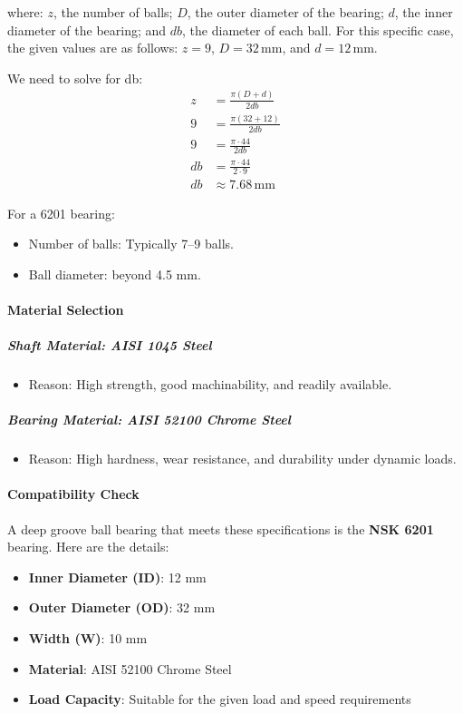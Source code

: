\documentclass[../../main]{subfiles}
\begin{document}
where: $z$, the number of balls; $D$, the outer diameter of the bearing; $d$, the inner diameter of the bearing; and $db$, the diameter of each ball. For this specific case, the given values are as follows: $z = 9$, $D = 32 \, \mathrm{mm}$, and $d = 12 \, \mathrm{mm}$.

We need to solve for db:
\begin{align*}
  z &= \frac{\pi (D + d)}{2 db} \\
  9 &= \frac{\pi (32 + 12)}{2 db} \\
  9 &= \frac{\pi \cdot 44}{2 db} \\
  db &= \frac{\pi \cdot 44}{2 \cdot 9} \\
  db &\approx 7.68 \, \mathrm{mm}
\end{align*}

For a 6201 bearing:

\begin{itemize}
\item
  Number of balls: Typically 7--9 balls.
\item
  Ball diameter: beyond 4.5 mm.
\end{itemize}

\paragraph{Material Selection}
\subparagraph{Shaft Material: AISI 1045 Steel}

\begin{itemize}
\item
  Reason: High strength, good machinability, and readily available.
\end{itemize}

\subparagraph{Bearing Material: AISI 52100 Chrome Steel}

\begin{itemize}
\item
  Reason: High hardness, wear resistance, and durability under dynamic
  loads.
\end{itemize}

\paragraph{Compatibility Check}

A deep groove ball bearing that meets these specifications is the
\textbf{NSK 6201} bearing. Here are the details:

\begin{itemize}
\item
  \textbf{Inner Diameter (ID)}: 12 mm
\item
  \textbf{Outer Diameter (OD)}: 32 mm
\item
  \textbf{Width (W)}: 10 mm
\item
  \textbf{Material}: AISI 52100 Chrome Steel
\item
  \textbf{Load Capacity}: Suitable for the given load and speed
  requirements
\end{itemize}
\end{document}
